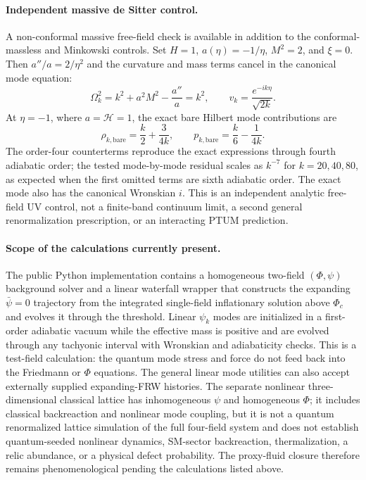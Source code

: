 \documentclass[epj]{svjour}
\begin{document}
\paragraph{Independent massive de Sitter control.}
A non-conformal massive free-field check is available in addition to the
conformal-massless and Minkowski controls. Set $H=1$,
$a(\eta)=-1/\eta$, $M^2=2$, and $\xi=0$. Then
$a''/a=2/\eta^2$ and the curvature and mass terms cancel in the canonical
mode equation:
\begin{equation}
\Omega_k^2=k^2+a^2M^2-\frac{a''}{a}=k^2,\qquad
v_k=\frac{e^{-ik\eta}}{\sqrt{2k}}.
\end{equation}
At $\eta=-1$, where $a=\mathcal H=1$, the exact bare Hilbert mode
contributions are
\begin{equation}
\rho_{k,\mathrm{bare}}=\frac{k}{2}+\frac{3}{4k},\qquad
p_{k,\mathrm{bare}}=\frac{k}{6}-\frac{1}{4k}.
\end{equation}
The order-four counterterms reproduce the exact expressions through
fourth adiabatic order; the tested mode-by-mode residual scales as
$k^{-7}$ for $k=20,40,80$, as expected when the first omitted terms are
sixth adiabatic order. The exact mode also has the canonical Wronskian
$i$. This is an independent analytic free-field UV control, not a
finite-band continuum limit, a second general renormalization
prescription, or an interacting PTUM prediction.

\paragraph{Scope of the calculations currently present.}
The public Python implementation contains a homogeneous two-field
$(\Phi,\psi)$ background solver and a linear waterfall wrapper that
constructs the expanding $\bar\psi=0$ trajectory from the integrated
single-field inflationary solution above $\Phi_c$ and evolves it through
the threshold. Linear $\psi_k$ modes are initialized in a first-order
adiabatic vacuum while the effective mass is positive and are evolved
through any tachyonic interval with Wronskian and adiabaticity checks.
This is a test-field calculation: the quantum mode stress and force do
not feed back into the Friedmann or $\Phi$ equations. The general linear
mode utilities can also accept externally supplied expanding-FRW
histories. The separate nonlinear three-dimensional classical lattice
has inhomogeneous $\psi$ and homogeneous $\Phi$; it includes classical
backreaction and nonlinear mode coupling, but it is not a quantum
renormalized lattice simulation of the full four-field system and does
not establish quantum-seeded nonlinear dynamics, SM-sector backreaction,
thermalization, a relic abundance, or a physical defect probability.
The proxy-fluid closure therefore remains phenomenological pending
the calculations listed above.
\end{document}
